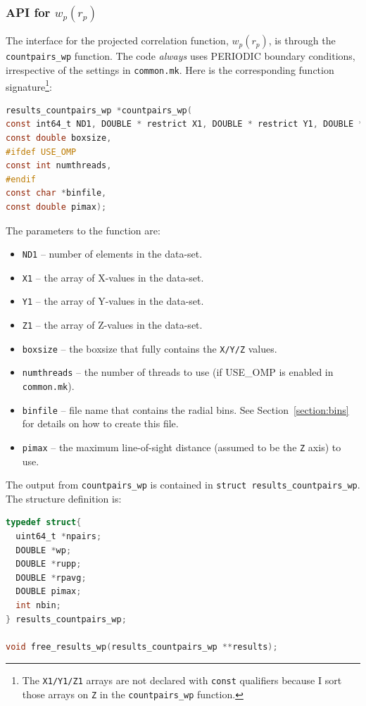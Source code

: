 \documentclass[12pt,titlepage,justified]{article}
\newcommand{\wprp}{\ensuremath{{w_p(r_p)}}\xspace}
\begin{document}
\subsubsection{API for \texorpdfstring{\wprp}{wp(rp)}}
The interface for the projected correlation function, \wprp, is through the \texttt{countpairs\_wp} function. The code 
{\em always} uses PERIODIC boundary conditions, irrespective of the settings in \texttt{common.mk}. Here is 
the corresponding function signature\footnote{The \texttt{X1/Y1/Z1} arrays are not 
declared with \texttt{const} qualifiers because I sort those arrays on \texttt{Z} in the 
\texttt{countpairs\_wp} function.}:
\begin{lstlisting}[language=C,numbers=none,label={code:API_wp},basicstyle=\scriptsize,caption={API for the \wprp}]
results_countpairs_wp *countpairs_wp(
const int64_t ND1, DOUBLE * restrict X1, DOUBLE * restrict Y1, DOUBLE * restrict Z1,
const double boxsize, 
#ifdef USE_OMP
const int numthreads,
#endif
const char *binfile,
const double pimax);
\end{lstlisting}

The parameters to the function are:
\begin{itemize}
\item \texttt{ND1} -- number of elements in the data-set.
\item \texttt{X1}  -- the array of X-values in the data-set.
\item \texttt{Y1}  -- the array of Y-values in the data-set.
\item \texttt{Z1}  -- the array of Z-values in the data-set.
\item \texttt{boxsize}  -- the boxsize that fully contains the \texttt{X/Y/Z} values. 
\item \texttt{numthreads} -- the number of threads to use (if USE\_OMP is enabled in \texttt{common.mk}).
\item \texttt{binfile} -- file name that contains the radial bins. See Section~\ref{section:bins} for details on how to create this file.
\item \texttt{pimax} -- the maximum line-of-sight distance (assumed to be the \texttt{Z} axis) to use. 
\end{itemize}

The output from \texttt{countpairs\_wp} is contained in \texttt{struct results\_countpairs\_wp}. The structure definition is:
\begin{lstlisting}[language=C,numbers=none,label={code:API_wp_struct},basicstyle=\scriptsize,caption={Structure definition for the output of \wprp}]
typedef struct{
  uint64_t *npairs;
  DOUBLE *wp;
  DOUBLE *rupp;
  DOUBLE *rpavg;
  DOUBLE pimax;
  int nbin;
} results_countpairs_wp;

void free_results_wp(results_countpairs_wp **results);
\end{lstlisting}
\end{document}
